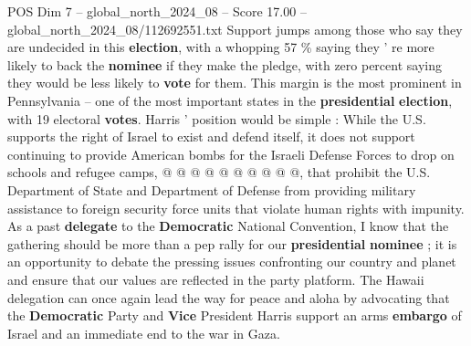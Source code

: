 \begin{textsample}{POS Dim 7 – global\_north\_2024\_08 – Score 17.00 – global\_north\_2024\_08/112692551.txt}
Support jumps among those who say they are undecided in this \textbf{election}, with a whopping 57 \% saying they ' re more likely to back the \textbf{nominee} if they make the pledge, with zero percent saying they would be less likely to \textbf{vote} for them.
This margin is the most prominent in Pennsylvania -- one of the most important states in the \textbf{presidential} \textbf{election}, with 19 electoral \textbf{votes}.
Harris ' position would be simple : While the U.S. supports the right of Israel to exist and defend itself, it does not support continuing to provide American bombs for the Israeli Defense Forces to drop on schools and refugee camps, @ @ @ @ @ @ @ @ @ @, that prohibit the U.S.
Department of State and Department of Defense from providing military assistance to foreign security force units that violate human rights with impunity.
As a past \textbf{delegate} to the \textbf{Democratic} National Convention, I know that the gathering should be more than a pep rally for our \textbf{presidential} \textbf{nominee} ; it is an opportunity to debate the pressing issues confronting our country and planet and ensure that our values are reflected in the party platform.
The Hawaii delegation can once again lead the way for peace and aloha by advocating that the \textbf{Democratic} Party and \textbf{Vice} President Harris support an arms \textbf{embargo} of Israel and an immediate end to the war in Gaza.

\end{textsample}
